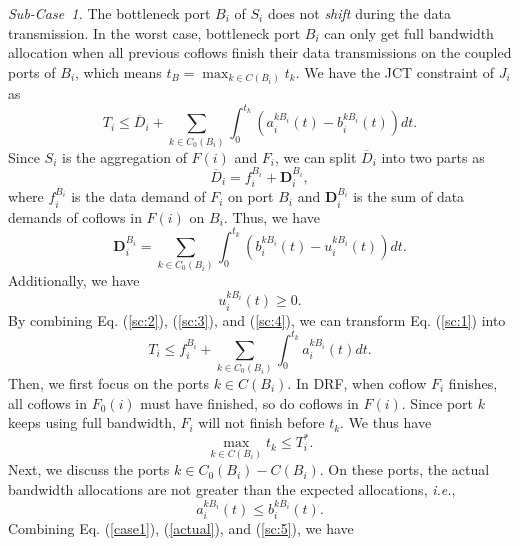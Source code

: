 \documentclass[10pt,journal,compsoc]{IEEEtran}
\begin{document}
\begin{IEEEproof}
\emph{Sub-Case~1.} The bottleneck port $B_i$ of $S_i$ does not \emph{shift} during the data transmission.
%
In the worst case, bottleneck port $B_i$ can only get full bandwidth allocation when all previous coflows finish their data transmissions on the coupled ports of $B_i$, which means $t_B = \max_{k\in C(B_i)}t_k$.
%
We have the JCT constraint of $J_i$ as
%
\begin{equation}\label{sc:1}
	T_i \leq \overline{D}_i + \sum_{k\in C_0(B_i)}\int_0^{t_k}(a_i^{kB_i}(t)-b_i^{kB_i}(t))dt.
\end{equation}
%
Since $S_i$ is the aggregation of $F(i)$ and $F_i$, we can split $\overline{D}_i$ into two parts as
%
\begin{equation}\label{sc:2}
	\overline{D}_i = f_i^{B_i} + \mathbf{D}_i^{B_i},
\end{equation}
%
where $f_i^{B_i}$ is the data demand of $F_i$ on port $B_i$ and $\mathbf{D}_i^{B_i}$ is the sum of data demands of coflows in $F(i)$ on $B_i$.
%
Thus, we have
%
\begin{equation}\label{sc:3}
	\mathbf{D}_i^{B_i} = \sum_{k\in C_0(B_i)}\int_0^{t_k}(b_i^{kB_i}(t)-u_i^{kB_i}(t))dt.
\end{equation}
%
Additionally, we have
%
\begin{equation}\label{sc:4}
	u_i^{kB_i}(t) \geq 0.
\end{equation}
%
By combining Eq. (\ref{sc:2}), (\ref{sc:3}), and (\ref{sc:4}), we can transform Eq. (\ref{sc:1}) into
%
\begin{equation}\label{sc:1-0}
	T_i \leq f_i^{B_i} + \sum_{k\in C_0(B_i)}\int_0^{t_k}a_i^{kB_i}(t)dt.
\end{equation}
%
Then, we first focus on the ports $k$$\in$$C(B_i)$.
%
In DRF, when coflow $F_i$ finishes, all coflows in $F_0(i)$ must have finished, so do coflows in $F(i)$.
%
Since port $k$ keeps using full bandwidth, $F_i$ will not finish before $t_k$.
%
We thus have
%
\begin{equation}\label{sc:1-1}
	\max_{k\in C(B_i)}t_k \leq T_i^*.
\end{equation}
%
Next, we discuss the ports $k$$\in$$C_0(B_i)-C(B_i)$.
%
On these ports, the actual bandwidth allocations are not greater than the expected allocations, \emph{i.e.},
%
\begin{equation}\label{sc:5}
	a_i^{kB_i}(t)\leq b_i^{kB_i}(t).
\end{equation}
%
Combining Eq. (\ref{case1}), (\ref{actual}), and (\ref{sc:5}), we have
%
\begin{equation}\label{sc:1-2}

\end{equation}
\end{IEEEproof}
\end{document}
